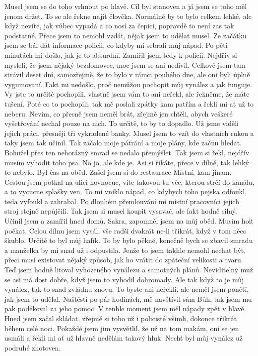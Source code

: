 Musel jsem se do toho vrhnout po hlavě. Cíl byl stanoven a já jsem se toho měl jenom držet. To se ale řekne najít člověka. Normálně by to bylo celkem lehké, ale když nevíte, jak vůbec vypadá a co nosí za čepici, popravdě to není zas tak podstatné. Přece jsem to nemohl vzdát, nějak jsem to udělat musel. Ze začátku jsem se bál dát informace policii, co kdyby mi sebrali můj nápad. Po pěti minutách mi došlo, jak je to absurdní. Zamířil jsem tedy k policii. Nejdřív si mysleli, že jsem nějaký bezdomovec, moc jsem se ani nedivil. Celkově jsem tam strávil deset dní, samozřejmě, že to bylo v rámci pouhého dne, ale oni byli úplně vygumovaní. Fakt mi nedošlo, proč nemůžou pochopit můj vynález a jak funguje. Vy jste to určitě pochopili, vlastně jsem vám to ani neřekl, ale řekněme, že máte tušení. Poté co to pochopili, tak mě poslali zpátky kam patřím a řekli mi ať už to neberu. Nevím, co přesně jsem neměl brát, zřejmě jen chtěli, abych veškeré vyšetřování nechal pouze na nich. To určitě, to by to dopadlo. Už jsme viděli jejich práci, přesněji tři vykradené banky. Musel jsem to vzít do vlastních rukou a taky jsem tak učinil. Tak začalo moje pátrání a moje plány, kde začnu hledat. Bohužel přes ten nehorázný smrad se nedalo přemýšlet. Tak jsem si řekl, nejdřív musím vyhodit toho psa. No jo, ale kde je. Asi si říkáte, přece v dílně, tak lehký to nebylo. Byl čas na oběd. Zašel jsem si do restaurace Místní, kam jinam. Cestou jsem potkal na ulici hovnocuc, víte takovou tu věc, kterou strčí do kanálu, a to vycucne splašky ven. To mi vniklo nápad, co kdybych toho pejska odfoukl, teda vyfoukl a zahrabal. Po dlouhém přemlouvání mi místní pracovníci jejich stroj stejně nepůjčili. Tak jsem si musel koupit vysavač, ale fakt hodně silný. Učinil jsem a zamířil hned domů. Sakra, zapomněl jsem na můj oběd. Musím holt počkat. Celou dílnu jsem vysál, vše radši dvakrát ne-li třikrát, když v tom něco škublo. Určitě to byl můj hafík. To by bylo pěkné, konečně bych se zbavil smradu a manželka by mi snad už i odpustila. Jenže to jsem takhle nemohl nechat být, přeci musí existovat nějaký způsob, jak ho vrátit do zpáteční velikosti a tvaru. Teď jsem hodně litoval vyhozeného vynálezu a samotných plánů. Neviditelný muž se asi má dost dobře, když jsem to vyhodil dohromady. Ale tak když to je můj vynález, tak to snad zvládnu znovu. To byste ani neřekli, ale neměl jsem ponětí, jak jsem to udělal. Naštěstí po pár hodinách, mě navštívil sám Bůh, tak jsem mu pak poděkoval za jeho pomoc. V tenhle moment jsem měl nápady zpět v hlavě. Hned jsem začal skládat, zřejmě si toho už i policisté všimli, dokonce třikrát během celé noci. Pokaždé jsem jim vysvětlil, že už na tom makám, oni se jen usmáli a řekli mi ať už hlavně nedělám takový hluk. Nechť byl můj vynález už podruhé zhotoven.

